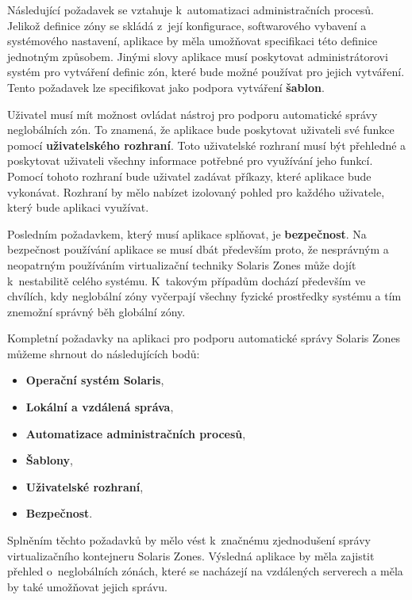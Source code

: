 Následující požadavek se vztahuje k~automatizaci administračních procesů. Jelikož definice zóny se skládá z~její
konfigurace, softwarového vybavení a systémového nastavení, aplikace by měla umožňovat specifikaci této definice 
jednotným způsobem. Jinými slovy aplikace musí poskytovat administrátorovi systém pro vytváření definic zón, které bude možné
používat pro jejich vytváření. Tento požadavek lze specifikovat jako podpora vytváření \textbf{šablon}.

Uživatel musí mít možnost ovládat nástroj pro podporu automatické správy neglobálních zón. To znamená, že aplikace bude
poskytovat uživateli své funkce pomocí \textbf{uživatelského rozhraní}. Toto uživatelské rozhraní musí být přehledné a poskytovat
uživateli všechny informace potřebné pro využívání jeho funkcí. Pomocí tohoto rozhraní bude uživatel zadávat příkazy, které
aplikace bude vykonávat. Rozhraní by mělo nabízet izolovaný pohled pro každého uživatele, který bude aplikaci využívat.

Posledním požadavkem, který musí aplikace splňovat, je \textbf{bezpečnost}. Na bezpečnost používání aplikace se musí dbát především
proto, že nesprávným a neopatrným používáním virtualizační techniky Solaris Zones může dojít k~nestabilitě celého systému.
K~takovým případům dochází především ve chvílích, kdy neglobální zóny vyčerpají všechny fyzické prostředky systému a tím
znemožní správný běh globální zóny.

Kompletní požadavky na aplikaci pro podporu automatické správy Solaris Zones můžeme shrnout do následujících bodů:
\begin{itemize}
 \item \textbf{Operační systém Solaris},
 \item \textbf{Lokální a vzdálená správa},
 \item \textbf{Automatizace administračních procesů},
 \item \textbf{Šablony},
 \item \textbf{Uživatelské rozhraní},
 \item \textbf{Bezpečnost}.
\end{itemize}
Splněním těchto požadavků by mělo vést k~značnému zjednodušení správy virtualizačního kontejneru Solaris Zones. Výsledná
aplikace by měla zajistit přehled o~neglobálních zónách, které se nacházejí na vzdálených serverech a měla by také umožňovat
jejich správu. 
